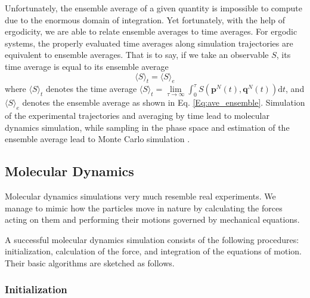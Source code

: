 \documentclass[letterpaper,12pt]{article}
\numberwithin{equation}{section}
\begin{document}
Unfortunately, the ensemble average of a given quantity is impossible to compute due to the enormous domain of integration. Yet fortunately, with the help of ergodicity, we are able to relate ensemble averages to time averages. For ergodic systems, the properly evaluated time averages along simulation trajectories are equivalent to ensemble averages. That is to say, if we take an observable $S$, its time average is equal to its ensemble average
\begin{equation}
    \langle S\rangle_t=\langle S\rangle_{e}
\end{equation}
where $\langle S\rangle_t$ denotes the time average $\langle S\rangle_t=\lim\limits_{\tau\rightarrow \infty}\int_0^\tau{S\left(\boldsymbol{p}^N(t),\boldsymbol{q}^N(t)\right)\mathrm{d}t}$, and $\langle S\rangle_e$ denotes the ensemble average as shown in Eq. \ref{Eq:ave_ensemble}. Simulation of the experimental trajectories and averaging by time lead to molecular dynamics simulation, while sampling in the phase space and estimation of the ensemble average lead to Monte Carlo simulation \cite{UMS,Multiscale}. 

\subsection{Molecular Dynamics}

Molecular dynamics simulations very much resemble real experiments. We manage to mimic how the particles move in nature by calculating the forces acting on them and performing their motions governed by mechanical equations.

A successful molecular dynamics simulation consists of the following procedures: initialization, calculation of the force, and integration of the equations of motion. Their basic algorithms are sketched as follows\cite{UMS}. 

\subsubsection{Initialization}
\end{document}

